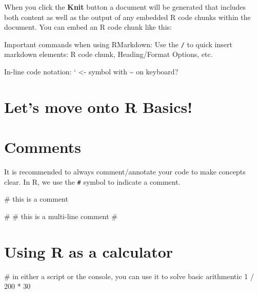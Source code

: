 \documentclass[
  letterpaper,
  DIV=11,
  numbers=noendperiod]{scrreprt}
\newenvironment{Shaded}{\begin{snugshade}}{\end{snugshade}}
\newcommand{\CommentTok}[1]{\textcolor[rgb]{0.37,0.37,0.37}{#1}}
\newcommand{\DecValTok}[1]{\textcolor[rgb]{0.68,0.00,0.00}{#1}}
\newcommand{\SpecialCharTok}[1]{\textcolor[rgb]{0.37,0.37,0.37}{#1}}
\begin{document}
When you click the \textbf{Knit} button a document will be generated
that includes both content as well as the output of any embedded R code
chunks within the document. You can embed an R code chunk like this:

Important commands when using RMarkdown: Use the \texttt{/} to quick
insert markdown elements: R code chunk, Heading/Format Options, etc.

In-line code notation: ` \textless- symbol with \textasciitilde{} on
keyboard?

\section*{Let's move onto R Basics!}\label{lets-move-onto-r-basics}


\section*{Comments}\label{comments}


It is recommended to always comment/annotate your code to make concepts
clear. In R, we use the \texttt{\#} symbol to indicate a comment.

\begin{Shaded}
\begin{Highlighting}[]
\CommentTok{\# this is a comment }

\CommentTok{\#\textquotesingle{} }
\CommentTok{\#\textquotesingle{} this is a multi{-}line comment}
\CommentTok{\#\textquotesingle{} }
\end{Highlighting}
\end{Shaded}

\section*{Using R as a calculator}\label{using-r-as-a-calculator}


\begin{Shaded}
\begin{Highlighting}[]
\CommentTok{\# in either a script or the console, you can use it to solve basic arithmentic}
\DecValTok{1} \SpecialCharTok{/} \DecValTok{200} \SpecialCharTok{*} \DecValTok{30}
\end{Highlighting}
\end{Shaded}
\end{document}
